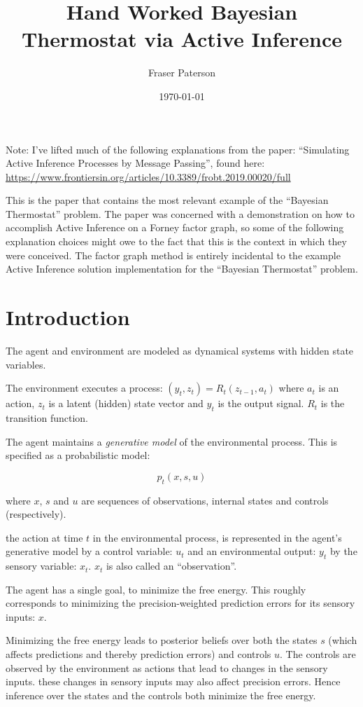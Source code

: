 \documentclass{article}
\title{Hand Worked Bayesian Thermostat via Active Inference}
\author{Fraser Paterson}
\date{\today}
\begin{document}
\maketitle

Note: I've lifted much of the following explanations from the paper: ``Simulating Active Inference Processes by Message Passing'', found here: \url{https://www.frontiersin.org/articles/10.3389/frobt.2019.00020/full} 

This is the paper that contains the most relevant example of the ``Bayesian Thermostat'' problem. The paper was concerned with a demonstration on how to accomplish Active Inference on a Forney factor graph, so some of the following explanation choices might owe to the fact that this is the context in which they were conceived. 
The factor graph method is entirely incidental to the example Active Inference solution implementation for the ``Bayesian Thermostat'' problem.  

\section{Introduction}

The agent and environment are modeled as dynamical systems with hidden state variables. 

The environment executes a process: $(y_t, z_t) = R_t(z_{t-1}, a_t)$ where $a_t$ is an action, $z_t$ is a latent (hidden) state vector and $y_t$ is the output signal. $R_t$ is the transition function.

The agent maintains a \textit{generative model} of the environmental process. This is specified as a probabilistic model: 

$$p_t(x, s, u)$$

where $x$, $s$ and $u$ are sequences of observations, internal states and controls (respectively). 

the action at time $t$ in the environmental process, is represented in the agent's generative model by a control variable: $u_t$ and an environmental output: $y_t$ by the sensory variable: $x_t$. $x_t$ is also called an ``observation''.  

The agent has a single goal, to minimize the free energy. This roughly corresponds to minimizing the precision-weighted prediction errors for its sensory inputs: $x$. 

Minimizing the free energy leads to posterior beliefs over both the states $s$ (which affects predictions and thereby prediction errors) and controls $u$. The controls are observed by the environment as actions that lead to changes in the sensory inputs. these changes in sensory inputs may also affect precision errors. Hence inference over the states and the controls both minimize the free energy. 
\end{document}
